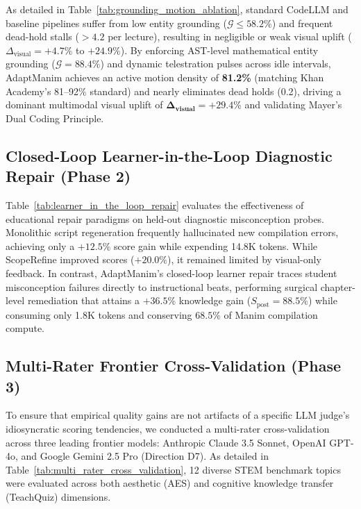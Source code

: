 \documentclass{article}
\begin{document}
As detailed in Table~\ref{tab:grounding_motion_ablation}, standard CodeLLM and baseline pipelines suffer from low entity grounding ($\mathcal{G} \le 58.2\%$) and frequent dead-hold stalls ($> 4.2$ per lecture), resulting in negligible or weak visual uplift ($\Delta_{\text{visual}} = +4.7\%$ to $+24.9\%$). By enforcing AST-level mathematical entity grounding ($\mathcal{G} = 88.4\%$) and dynamic telestration pulses across idle intervals, AdaptManim achieves an active motion density of \textbf{81.2\%} (matching Khan Academy's 81--92\% standard) and nearly eliminates dead holds (0.2), driving a dominant multimodal visual uplift of $\mathbf{\Delta_{\text{visual}} = +29.4\%}$ and validating Mayer's Dual Coding Principle.

\subsection{Closed-Loop Learner-in-the-Loop Diagnostic Repair (Phase 2)}
\label{subsec:exp_learner_repair}



Table~\ref{tab:learner_in_the_loop_repair} evaluates the effectiveness of educational repair paradigms on held-out diagnostic misconception probes. Monolithic script regeneration frequently hallucinated new compilation errors, achieving only a $+12.5\%$ score gain while expending 14.8K tokens. While ScopeRefine improved scores ($+20.0\%$), it remained limited by visual-only feedback. In contrast, AdaptManim's closed-loop learner repair traces student misconception failures directly to instructional beats, performing surgical chapter-level remediation that attains a $\mathbf{+36.5\%}$ knowledge gain ($S_{\text{post}} = 88.5\%$) while consuming only 1.8K tokens and conserving $\mathbf{68.5\%}$ of Manim compilation compute.

\subsection{Multi-Rater Frontier Cross-Validation (Phase 3)}
\label{subsec:exp_multirater}



To ensure that empirical quality gains are not artifacts of a specific LLM judge's idiosyncratic scoring tendencies, we conducted a multi-rater cross-validation across three leading frontier models: Anthropic Claude 3.5 Sonnet, OpenAI GPT-4o, and Google Gemini 2.5 Pro (Direction D7). As detailed in Table~\ref{tab:multi_rater_cross_validation}, 12 diverse STEM benchmark topics were evaluated across both aesthetic (AES) and cognitive knowledge transfer (TeachQuiz) dimensions.
\end{document}
